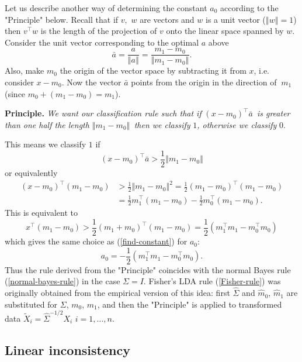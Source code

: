\documentclass[11pt,twoside]{article}%
\theoremstyle{change}
\begin{document}
Let us describe another way of determining the constant $a_{0}$ according to
the "Principle" below. Recall that if $v,$ $w$ are vectors and $w$ is a unit
vector ($\left\Vert w\right\Vert =1$) then $v^{\top}w$ is the length of the
projection of $v$ onto the linear space spanned by $w$. Consider the unit
vector corresponding to the optimal $a$ above
\[
\bar{a}=\frac{a}{\left\Vert a\right\Vert }=\frac{m_{1}-m_{0}}{\left\Vert
m_{1}-m_{0}\right\Vert }.
\]
Also, make $m_{0}$ the origin of the vector space by subtracting it from $x$,
i.e. consider $x-m_{0}$. Now the vector $\bar{a}$ points from the origin in
the direction of $\ m_{1}$ (since $m_{0}+\left(  m_{1}-m_{0}\right)  =m_{1}$).

\bigskip

\textbf{Principle.} \textit{We want our classification rule such that if
}$\left(  x-m_{0}\right)  ^{\top}\bar{a}$\textit{\ is greater than one half
the length }$\left\Vert m_{1}-m_{0}\right\Vert $\textit{\ then we classify
}$1$\textit{, otherwise we classify }$0.$

\bigskip

This means we classify $1$ if
\[
\left(  x-m_{0}\right)  ^{\top}\bar{a}>\frac{1}{2}\left\Vert m_{1}%
-m_{0}\right\Vert
\]
or equivalently
\begin{align*}
\left(  x-m_{0}\right)  ^{\top}\left(  m_{1}-m_{0}\right)   & >\frac{1}%
{2}\left\Vert m_{1}-m_{0}\right\Vert ^{2}=\frac{1}{2}\left(  m_{1}%
-m_{0}\right)  ^{\top}\left(  m_{1}-m_{0}\right) \\
& =\frac{1}{2}m_{1}^{\top}\left(  m_{1}-m_{0}\right)  -\frac{1}{2}m_{0}^{\top
}\left(  m_{1}-m_{0}\right)  .
\end{align*}
This is equivalent to
\[
x^{\top}\left(  m_{1}-m_{0}\right)  >\frac{1}{2}\left(  m_{1}+m_{0}\right)
^{\top}\left(  m_{1}-m_{0}\right)  =\frac{1}{2}\left(  m_{1}^{\top}m_{1}%
-m_{0}^{\top}m_{0}\right)
\]
which gives the same choice as (\ref{find-constant}) for $a_{0}$:%
\[
a_{0}=-\frac{1}{2}\left(  m_{1}^{\top}m_{1}-m_{0}^{\top}m_{0}\right)  .
\]
Thus the rule derived from the "Principle" coincides with the normal Bayes
rule (\ref{normal-bayes-rule}) in the case $\Sigma=I$. Fisher's LDA rule
(\ref{Fisher-rule}) was originally obtained from the empirical version of this
idea: first $\hat{\Sigma}$ and $\hat{m}_{0}$, $\hat{m}_{1}$ are substituted
for $\Sigma$, $m_{0}$, $m_{1}$, and then the "Principle" is applied to
transformed data $\tilde{X}_{i}=\hat{\Sigma}^{-1/2}X_{i}$ $i=1,\ldots,n$.

\subsection{Linear inconsistency}
\end{document}
